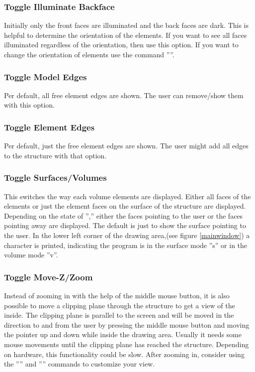 \documentclass{article}
\begin{document}
\subsubsection{\label{Toggle Illuminate Backface}Toggle Illuminate Backface}
Initially only the front faces are illuminated and the back faces are dark. This is helpful to determine the orientation of the elements. If you want to see all faces illuminated regardless of the orientation, then use this option. If you want to change the orientation of elements use the command ''''.

\subsubsection{\label{Toggle Model Edges}Toggle Model Edges}
Per default, all free element edges are shown. The user can remove/show them with this option.

\subsubsection{\label{Toggle Element Edges}Toggle Element Edges}
Per default, just the free element edges are shown. The user might add all edges to the structure with that option.

\subsubsection{\label{Toggle Surfaces/Volumes}Toggle Surfaces/Volumes}
This switches the way each volume elements are displayed. Either all faces of the elements or just the element faces on the surface of the structure are displayed. Depending on the state of '','' either the faces pointing to the user or the faces pointing away are displayed. The default is just to show the surface pointing to the user. In the lower left corner of the drawing area,(see figure \ref{mainwindow}) a character is printed, indicating the program is in the surface mode ''s'' or in the volume mode ''v''.

\subsubsection{\label{Toggle Move-Z/Zoom}Toggle Move-Z/Zoom}
Instead of zooming in with the help of the middle mouse button, it is also possible to move a clipping plane through the structure to get a view of the inside. The clipping plane is parallel to the screen and will be moved in the direction to and from the user by pressing the middle mouse button and moving the pointer up and down while inside the drawing area. Usually it needs some mouse movements until the clipping plane has reached the structure. Depending on hardware, this functionality could be slow. After zooming in, consider using the '''' and '''' commands to customize your view.
\end{document}
